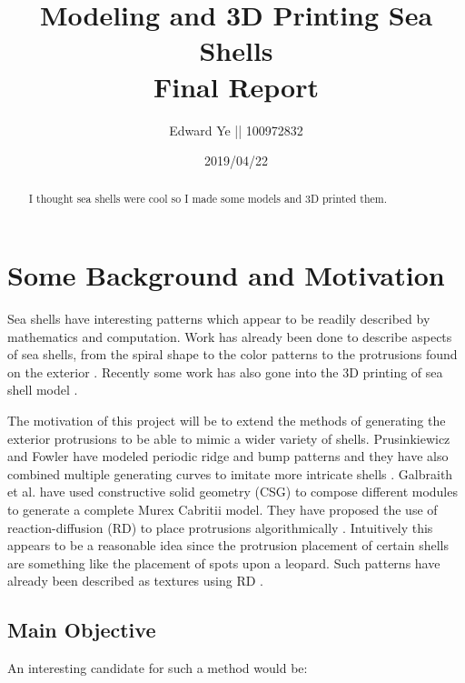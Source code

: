 \documentclass[a4paper]{article}
\title{Modeling and 3D Printing Sea Shells\\
		\large Final Report}
\author{Edward Ye || 100972832}
\date{2019/04/22}
\begin{document}
\maketitle

\begin{abstract}
	I thought sea shells were cool so I made some models and 3D printed them.
\end{abstract}

\tableofcontents

\section{Some Background and Motivation}

Sea shells have interesting patterns which  appear to be readily described by mathematics and computation. Work has already been done to describe aspects of sea shells, from the spiral shape to the color patterns to the protrusions found on the exterior \cite{Galbraith00modelingmurex}\cite{abss}\cite{VANDERHELM1998505}. Recently some work has also gone into the 3D printing of sea shell model \cite{3dprinting-seashells}\cite{bachman-3dprinting}.

The motivation of this project will be to extend the methods of generating the exterior protrusions to be able to mimic a wider variety of shells. Prusinkiewicz and Fowler have modeled periodic ridge and bump patterns and they have also combined multiple generating curves to imitate more intricate shells \cite{abss}. Galbraith et al. have used constructive solid geometry (CSG) to compose different modules to generate a complete Murex Cabritii model. They have proposed the use of reaction-diffusion (RD) to place protrusions algorithmically \cite{Galbraith00modelingmurex}. Intuitively this appears to be a reasonable idea since the protrusion placement of certain shells are something like the placement of spots upon a leopard. Such patterns have already been described as textures using RD \cite{Turk:1991:GTA:127719.122749}.

\subsection{Main Objective}

An interesting candidate for such a method would be:
\end{document}
